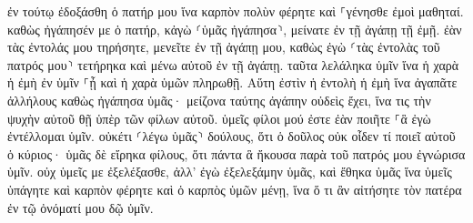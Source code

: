 \documentclass{openreader}
\begin{document}
ἐν τούτῳ ἐδοξάσθη ὁ πατήρ μου ἵνα καρπὸν πολὺν φέρητε καὶ ⸀γένησθε ἐμοὶ μαθηταί. 
καθὼς ἠγάπησέν με ὁ πατήρ, κἀγὼ ⸂ὑμᾶς ἠγάπησα⸃, μείνατε ἐν τῇ ἀγάπῃ τῇ ἐμῇ. 
ἐὰν τὰς ἐντολάς μου τηρήσητε, μενεῖτε ἐν τῇ ἀγάπῃ μου, καθὼς ἐγὼ ⸂τὰς ἐντολὰς τοῦ πατρός μου⸃ τετήρηκα καὶ μένω αὐτοῦ ἐν τῇ ἀγάπῃ. 
ταῦτα λελάληκα ὑμῖν ἵνα ἡ χαρὰ ἡ ἐμὴ ἐν ὑμῖν ⸀ᾖ καὶ ἡ χαρὰ ὑμῶν πληρωθῇ. 
Αὕτη ἐστὶν ἡ ἐντολὴ ἡ ἐμὴ ἵνα ἀγαπᾶτε ἀλλήλους καθὼς ἠγάπησα ὑμᾶς· 
μείζονα ταύτης ἀγάπην οὐδεὶς ἔχει, ἵνα τις τὴν ψυχὴν αὐτοῦ θῇ ὑπὲρ τῶν φίλων αὐτοῦ. 
ὑμεῖς φίλοι μού ἐστε ἐὰν ποιῆτε ⸀ἃ ἐγὼ ἐντέλλομαι ὑμῖν. 
οὐκέτι ⸂λέγω ὑμᾶς⸃ δούλους, ὅτι ὁ δοῦλος οὐκ οἶδεν τί ποιεῖ αὐτοῦ ὁ κύριος· ὑμᾶς δὲ εἴρηκα φίλους, ὅτι πάντα ἃ ἤκουσα παρὰ τοῦ πατρός μου ἐγνώρισα ὑμῖν. 
οὐχ ὑμεῖς με ἐξελέξασθε, ἀλλ’ ἐγὼ ἐξελεξάμην ὑμᾶς, καὶ ἔθηκα ὑμᾶς ἵνα ὑμεῖς ὑπάγητε καὶ καρπὸν φέρητε καὶ ὁ καρπὸς ὑμῶν μένῃ, ἵνα ὅ τι ἂν αἰτήσητε τὸν πατέρα ἐν τῷ ὀνόματί μου δῷ ὑμῖν. 
\end{document}
